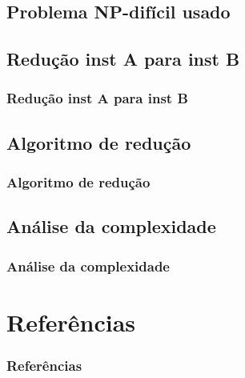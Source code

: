 \documentclass{beamer}
\begin{document}
\subsection{Problema NP-difícil usado}
\begin{frame}
\frametitle{}
\end{frame}

\subsection{Redução inst A para inst B}
\begin{frame}
\frametitle{Redução inst A para inst B}
\end{frame}

\subsection{Algoritmo de redução}
\begin{frame}
\frametitle{Algoritmo de redução}
\end{frame}

\subsection{Análise da complexidade}
\begin{frame}
\frametitle{Análise da complexidade}
\end{frame}

\section{Referências}
\begin{frame}
\frametitle{Referências}
\end{frame}
\end{document}
